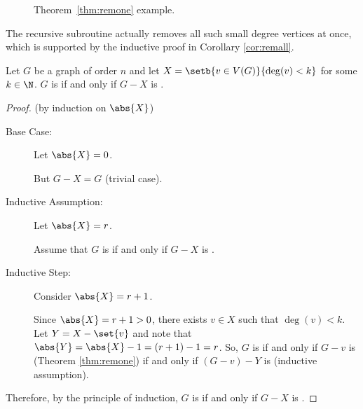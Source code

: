 \begin{figure}[H]
  \centering
  \caption{Theorem~\ref{thm:remone} example.}
  \label{fig:lowdeg}
\end{figure}

The recursive subroutine actually removes all such small degree vertices at once, which is supported by the
inductive proof in Corollary \ref{cor:remall}.

\begin{corollary}
  \label{cor:remall}
  Let \(G\) be a graph of order \(n\) and let \(X=\setb{v\in V(G)}{\deg(v)<k}\) for some \(k\in\N\).  \(G\) is
   if and only if \(G-X\) is .
\end{corollary}

\begin{proof}
  (by induction on \(\abs{X}\))
  \begin{description}
  \item[Base Case:] Let \(\abs{X}=0\).

    But \(G-X=G\) (trivial case).

  \item[Inductive Assumption:] Let \(\abs{X}=r\).

    Assume that \(G\) is  if and only if \(G-X\) is .

  \item[Inductive Step:] Consider \(\abs{X}=r+1\).
    
    Since \(\abs{X}=r+1>0\), there exists \(v\in X\) such that \(\deg(v)<k\).  Let \(Y=X-\set{v}\) and note that
    \(\abs{Y}=\abs{X}-1=(r+1)-1=r\).  So, \(G\) is  if and only if \(G-v\) is  (Theorem
    \ref{thm:remone}) if and only if \((G-v)-Y\) is  (inductive assumption).
  \end{description}

  Therefore, by the principle of induction, \(G\) is  if and only if \(G-X\) is .
\end{proof}

